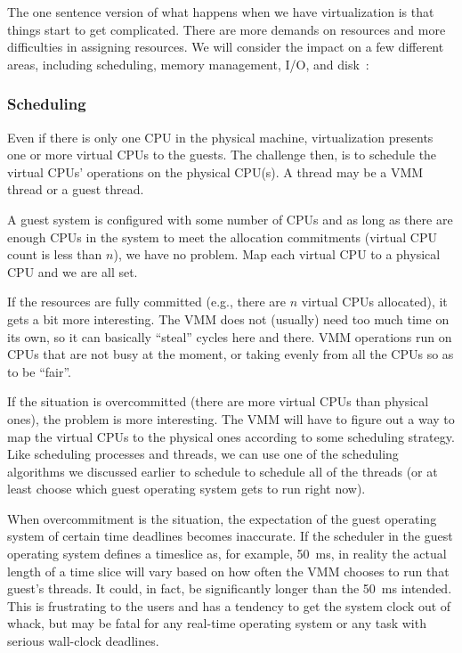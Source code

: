 The one sentence version of what happens when we have virtualization is that things start to get complicated. There are more demands on resources and more difficulties in assigning resources. We will consider the impact on a few different areas, including scheduling, memory management, I/O, and disk~\cite{osc}:

\subsubsection*{Scheduling}

Even if there is only one CPU in the physical machine, virtualization presents one or more virtual CPUs to the guests. The challenge then, is to schedule the virtual CPUs' operations on the physical CPU(s). A thread may be a VMM thread or a guest thread.

A guest system is configured with some number of CPUs and as long as there are enough CPUs in the system to meet the allocation commitments (virtual CPU count is less than $n$), we have no problem. Map each virtual CPU to a physical CPU and we are all set. 

If the resources are fully committed (e.g., there are $n$ virtual CPUs allocated), it gets a bit more interesting. The VMM does not (usually) need too much time on its own, so it can basically ``steal'' cycles here and there. VMM operations run on CPUs that are not busy at the moment, or taking evenly from all the CPUs so as to be ``fair''. 

If the situation is overcommitted (there are more virtual CPUs than physical ones), the problem is more interesting. The VMM will have to figure out a way to map the virtual CPUs to the physical ones according to some scheduling strategy. Like scheduling processes and threads, we can use one of the scheduling algorithms we discussed earlier to schedule to schedule all of the threads (or at least choose which guest operating system gets to run right now).

When overcommitment is the situation, the expectation of the guest operating system of certain time deadlines becomes inaccurate. If the scheduler in the guest operating system defines a timeslice as, for example, 50~ms, in reality the actual length of a time slice will vary based on how often the VMM chooses to run that guest's threads. It could, in fact, be significantly longer than the 50~ms intended. This is frustrating to the users and has a tendency to get the system clock out of whack, but may be fatal for any real-time operating system or any task with serious wall-clock deadlines.

